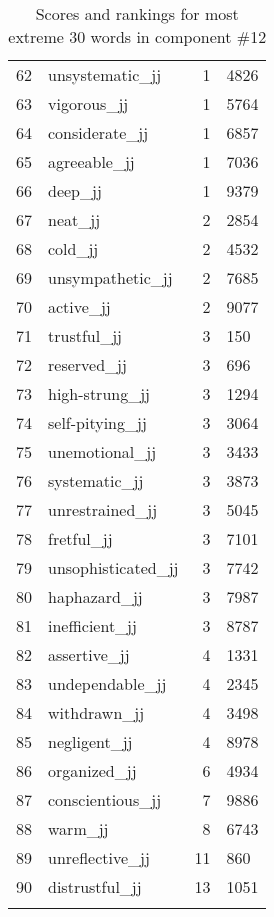\begin{longtable}[!htbp]{| rlr@{.}l |}
    62 & unsystematic\_jj & 1 & 4826 \\
    63 & vigorous\_jj & 1 & 5764 \\
    64 & considerate\_jj & 1 & 6857 \\
    65 & agreeable\_jj & 1 & 7036 \\
    66 & deep\_jj & 1 & 9379 \\
    67 & neat\_jj & 2 & 2854 \\
    68 & cold\_jj & 2 & 4532 \\
    69 & unsympathetic\_jj & 2 & 7685 \\
    70 & active\_jj & 2 & 9077 \\
    71 & trustful\_jj & 3 & 150 \\
    72 & reserved\_jj & 3 & 696 \\
    73 & high-strung\_jj & 3 & 1294 \\
    74 & self-pitying\_jj & 3 & 3064 \\
    75 & unemotional\_jj & 3 & 3433 \\
    76 & systematic\_jj & 3 & 3873 \\
    77 & unrestrained\_jj & 3 & 5045 \\
    78 & fretful\_jj & 3 & 7101 \\
    79 & unsophisticated\_jj & 3 & 7742 \\
    80 & haphazard\_jj & 3 & 7987 \\
    81 & inefficient\_jj & 3 & 8787 \\
    82 & assertive\_jj & 4 & 1331 \\
    83 & undependable\_jj & 4 & 2345 \\
    84 & withdrawn\_jj & 4 & 3498 \\
    85 & negligent\_jj & 4 & 8978 \\
    86 & organized\_jj & 6 & 4934 \\
    87 & conscientious\_jj & 7 & 9886 \\
    88 & warm\_jj & 8 & 6743 \\
    89 & unreflective\_jj & 11 & 860 \\
    90 & distrustful\_jj & 13 & 1051 \\
    \hline
    \caption{Scores and rankings for most extreme 30 words in component \#12} \\
\end{longtable}

